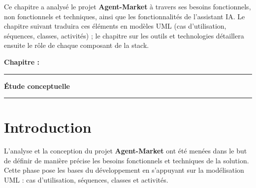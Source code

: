 \documentclass[12pt,a4paper]{report}
\numberwithin{figure}{chapter}
\numberwithin{table}{chapter}
\newcommand{\chapterpagetitle}[1]{%
  \vspace*{1.2cm}%
  {\noindent\fontsize{18}{22}\selectfont\bfseries\color{titlegreen} Chapitre \thechapter :}\par
  \vspace*{6.0cm}%
  \noindent\textcolor{darkgreen}{\rule{\textwidth}{2pt}}%
  \vspace{1.5cm}%
  \begin{center}
    {\fontsize{24}{28}\selectfont\bfseries\color{titlegreen} #1}%
  \end{center}
  \vspace{1.5cm}%
  \noindent\textcolor{darkgreen}{\rule{\textwidth}{2pt}}%
  \vfill
  \newpage
}
\begin{document}
Ce chapitre a analysé le projet \textbf{Agent-Market} à travers ses besoins fonctionnels, non fonctionnels et techniques, ainsi que les fonctionnalités de l’assistant IA. Le chapitre suivant traduira ces éléments en modèles UML (cas d’utilisation, séquences, classes, activités) ; le chapitre sur les outils et technologies détaillera ensuite le rôle de chaque composant de la stack.


\newpage




\chapterpagetitle{Étude conceptuelle}

\setlength{\intextsep}{8pt plus 2pt minus 2pt}
\setlength{\textfloatsep}{10pt plus 2pt minus 2pt}
\setlength{\floatsep}{8pt plus 2pt minus 2pt}
\captionsetup{skip=6pt}

\newcommand{\figlead}[2][0.82\textheight]{%
  \par\Needspace{#1}%
  #2\par\nopagebreak\vspace{2pt}%
}
\newcommand{\deschead}[1]{%
  \par\noindent\textbf{Description textuelle «~#1~»}\par\nopagebreak\vspace{2pt}%
}


\section{Introduction}

L’analyse et la conception du projet \textbf{Agent-Market} ont été menées dans le but de définir de manière précise les besoins fonctionnels et techniques de la solution. Cette phase pose les bases du développement en s’appuyant sur la modélisation UML : cas d’utilisation, séquences, classes et activités.
\end{document}
